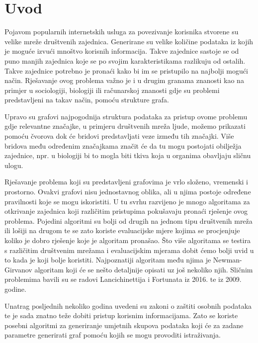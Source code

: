 \chapter{Uvod}

Pojavom popularnih internetskih usluga za povezivanje korisnika stvorene su velike mreže društvenih zajednica. Generirane su velike količine podataka iz kojih je moguće izvući mnoštvo korisnih informacija. Takve zajednice sastoje se od puno manjih zajednica koje se po svojim karakteristikama razlikuju od ostalih. Takve zajednice potrebno je pronaći kako bi im se pristupilo na najbolji mogući način. Rješavanje ovog problema važno je i u drugim granama znanosti kao na primjer u sociologiji, biologiji ili računarskoj znanosti gdje su problemi predstavljeni na takav način, pomoću strukture grafa. 

Upravo su grafovi najpogodnija struktura podataka za pristup ovome problemu gdje relevantne značajke, u primjeru društvenih mreža ljude, možemo prikazati pomoću čvorova dok će bridovi predstavljati veze između tih značajki. Više bridova među određenim značajkama značit će da tu mogu postojati obilježja zajednice, npr. u biologiji bi to mogla biti tkiva koja u organima obavljaju sličnu ulogu. 

Rješavanje problema koji su predstavljeni grafovima je vrlo složeno, vremenski i prostorno. Ovakvi grafovi nisu jednostavnog oblika, ali u njima postoje određene pravilnosti koje se mogu iskoristiti. U tu svrhu razvijeno je mnogo algoritama za otkrivanje zajednica koji različitim pristupima pokušavaju pronaći rješenje ovog problema. Pojedini algoritmi su bolji od drugih na jednom tipu društvenih mreža ili lošiji na drugom te se zato koriste evaluacijske mjere kojima se procjenjuje koliko je dobro rješenje koje je algoritam pronašao. Što više algoritama se testira s različitim društvenim mrežama i evaluacijskim mjerama dobit ćemo bolji uvid u to kada je koji bolje koristiti. Najpoznatiji algoritam među njima je Newman-Girvanov algoritam koji će se nešto detaljnije opisati uz još nekoliko njih. Sličnim problemima bavili su se radovi Lancichinettija i Fortunata \cite{fortunato2016community} iz 2016. te \cite{lancichinetti2009community} iz 2009. godine.

Unatrag posljednih nekoliko godina uvedeni su zakoni o zaštiti osobnih podataka te je sada znatno teže dobiti pristup korisnim informacijama. Zato se koriste posebni algoritmi za generiranje umjetnih skupova podataka koji će za zadane parametre generirati graf pomoću kojih se mogu provoditi istraživanja. 

